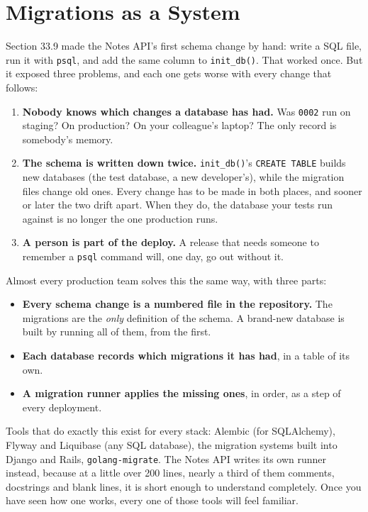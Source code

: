 \setcounter{section}{9}
\section{Migrations as a System}\label{33-logic-execution:3310-migrations-as-a-system}

Section 33.9 made the Notes API's first schema change by hand: write a SQL file, run it with \texttt{psql}, and add the same column to \texttt{init\_db()}. That worked once. But it exposed three problems, and each one gets worse with every change that follows:

\begin{enumerate}
\def\labelenumi{\arabic{enumi}.}
\tightlist
\item
  \textbf{Nobody knows which changes a database has had.} Was \texttt{0002} run on staging? On production? On your colleague's laptop? The only record is somebody's memory.
\item
  \textbf{The schema is written down twice.} \texttt{init\_db()}'s \texttt{CREATE\ TABLE} builds new databases (the test database, a new developer's), while the migration files change old ones. Every change has to be made in both places, and sooner or later the two drift apart. When they do, the database your tests run against is no longer the one production runs.
\item
  \textbf{A person is part of the deploy.} A release that needs someone to remember a \texttt{psql} command will, one day, go out without it.
\end{enumerate}

\noindent{}Almost every production team solves this the same way, with three parts:

\begin{itemize}
\tightlist
\item
  \textbf{Every schema change is a numbered file in the repository.} The migrations are the \emph{only} definition of the schema. A brand-new database is built by running all of them, from the first.
\item
  \textbf{Each database records which migrations it has had}, in a table of its own.
\item
  \textbf{A migration runner applies the missing ones}, in order, as a step of every deployment.
\end{itemize}

\noindent{}Tools that do exactly this exist for every stack: Alembic (for SQLAlchemy), Flyway and Liquibase (any SQL database), the migration systems built into Django and Rails, \texttt{golang-migrate}. The Notes API writes its own runner instead, because at a little over 200 lines, nearly a third of them comments, docstrings and blank lines, it is short enough to understand completely. Once you have seen how one works, every one of those tools will feel familiar.

